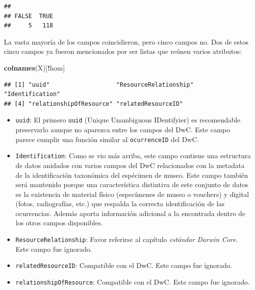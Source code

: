 \documentclass[sn-apa,pdflatex]{sn-jnl}
\newenvironment{Shaded}{\begin{snugshade}}{\end{snugshade}}
\newcommand{\AttributeTok}[1]{\textcolor[rgb]{0.13,0.29,0.53}{#1}}
\newcommand{\CommentTok}[1]{\textcolor[rgb]{0.56,0.35,0.01}{\textit{#1}}}
\newcommand{\FunctionTok}[1]{\textcolor[rgb]{0.13,0.29,0.53}{\textbf{#1}}}
\newcommand{\NormalTok}[1]{#1}
\newcommand{\OtherTok}[1]{\textcolor[rgb]{0.56,0.35,0.01}{#1}}
\newcommand{\SpecialCharTok}[1]{\textcolor[rgb]{0.81,0.36,0.00}{\textbf{#1}}}
\newcommand{\StringTok}[1]{\textcolor[rgb]{0.31,0.60,0.02}{#1}}
\providecommand{\tightlist}{%
  \setlength{\itemsep}{0pt}\setlength{\parskip}{0pt}}
\begin{document}
\begin{Shaded}
\end{Shaded}

\begin{verbatim}
## 
## FALSE  TRUE 
##     5   118
\end{verbatim}

La vasta mayoría de los campos coincidieron, pero cinco campos no. Dos
de estos cinco campos ya fueron mencionados por ser listas que reúnen
varios atributos:

\begin{Shaded}
\begin{Highlighting}[]
\FunctionTok{colnames}\NormalTok{(X)[}\SpecialCharTok{!}\NormalTok{hom]}
\end{Highlighting}
\end{Shaded}

\begin{verbatim}
## [1] "uuid"                   "ResourceRelationship"   "Identification"        
## [4] "relationshipOfResource" "relatedResourceID"
\end{verbatim}

\begin{itemize}
\tightlist
\item
  \texttt{uuid}: El primero \texttt{uuid} (Unique Unambiguous
  IDentifyier) es recomendable preservarlo aunque no aparezca entre los
  campos del DwC. Este campo parece cumplir una función similar al
  \texttt{ocurrenceID} del DwC.\\
\item
  \texttt{Identification}: Como se vio más arriba, este campo contiene
  una estructura de datos anidados con varios campos del DwC
  relacionados con la metadata de la identificación taxonómica del
  espécimen de museo. Este campo también será mantenido porque una
  característica distintiva de este conjunto de datos es la existencia
  de material físico (especímenes de museo o vouchers) y digital (fotos,
  radiografías, etc.) que respalda la correcta identificación de las
  ocurrencias. Además aporta información adicional a la encontrada
  dentro de los otros campos disponibles.\\
\item
  \texttt{ResourceRelationship}: Favor referirse al capítulo
  \emph{estándar Darwin Core}. Este campo fue ignorado.\\
\item
  \texttt{relatedResourceID}: Compatible con el DwC. Este campo fue
  ignorado.\\
\item
  \texttt{relationshipOfResource}: Compatible con el DwC. Este campo fue
  ignorado.
\end{itemize}
\end{document}
